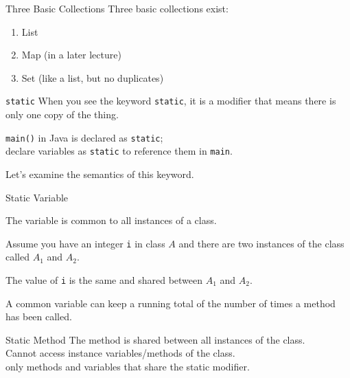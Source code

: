 \documentclass{beamer}
\begin{document}
\begin{frame}{Three Basic Collections}
Three basic collections exist: \\
\vspace{0.5em}
\begin{enumerate}
	\item List
	\item Map (in a later lecture)
	\item Set (like a list, but no duplicates)
\end{enumerate}
\end{frame}



\begin{frame}{\texttt{static}}
When you see the keyword \texttt{static}, it is a modifier that means there is only one copy of the thing. 

\texttt{main()} in Java is declared as \texttt{static}; \\
\quad declare variables as \texttt{static} to reference them in \texttt{main}. 

Let's examine the semantics of this keyword.
\end{frame}

\begin{frame}{Static Variable}

The variable is common to all instances of a class. 

Assume you have an integer \texttt{i} in class $A$ and there are two instances of the class called $A_{1}$ and $A_{2}$. 

The value of \texttt{i} is the same and shared between $A_{1}$ and $A_{2}$.

A common variable can  keep a running total of the number of times a method has been called.

\end{frame}

\begin{frame}{Static Method}
The method is shared between all instances of the class. 	\\
Cannot access instance variables/methods of the class.		\\
\quad only methods and variables that share the static modifier.
\end{frame}
\end{document}
